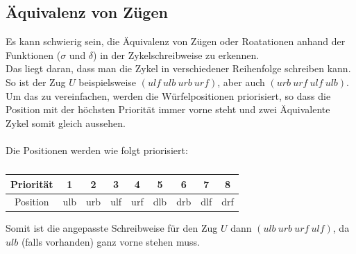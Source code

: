 \documentclass[12pt,a4paper, usenames, dvipsnames]{article}
\begin{document}













\subsection*{Äquivalenz von Zügen}


Es kann schwierig sein, die Äquivalenz von Zügen oder Roatationen anhand der Funktionen ($\sigma$ und $\delta$) in der Zykelschreibweise zu erkennen. \\
Das liegt daran, dass man die Zykel in verschiedener Reihenfolge schreiben kann. So ist der Zug $U$ beispielsweise $ (ulf \ ulb \ urb \ urf)$, aber auch $(urb \ urf \ ulf \ ulb)$.
\\
Um das zu vereinfachen, werden die Würfelpositionen priorisiert, so dass die Position mit der höchsten Priorität immer vorne steht und zwei Äquivalente Zykel somit gleich aussehen. \\
\\
Die Positionen werden wie folgt priorisiert:
\begin{table}[H]
\centering
\begin{tabular}{|c||c|c|c|c|c|c|c|c|}
\hline
Priorität & 1 & 2 & 3 & 4 & 5 & 6 & 7 & 8 \\
\hline
Position  & ulb & urb & ulf & urf & dlb & drb & dlf & drf \\
\hline
\end{tabular}
\caption[Priorität der Positionen (für Zykelschreibweise)]{}
\end{table}
Somit ist die angepasste Schreibweise für den Zug $U$ dann $(ulb \ urb \ urf \ ulf)$, da $ulb$ (falls vorhanden) ganz vorne stehen muss.














\end{document}
